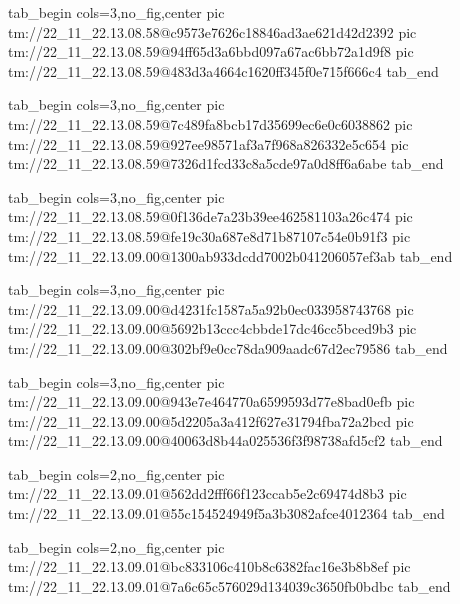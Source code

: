  
 
 
 
 

\qqSecCmtScr


\ifcmt
  tab_begin cols=3,no_fig,center
    pic tm://22_11_22.13.08.58@c9573e7626c18846ad3ae621d42d2392
    pic tm://22_11_22.13.08.59@94ff65d3a6bbd097a67ac6bb72a1d9f8
    pic tm://22_11_22.13.08.59@483d3a4664c1620ff345f0e715f666c4
  tab_end
\fi


\ifcmt
  tab_begin cols=3,no_fig,center
    pic tm://22_11_22.13.08.59@7c489fa8bcb17d35699ec6e0c6038862
    pic tm://22_11_22.13.08.59@927ee98571af3a7f968a826332e5c654
    pic tm://22_11_22.13.08.59@7326d1fcd33c8a5cde97a0d8ff6a6abe
  tab_end
\fi


\ifcmt
  tab_begin cols=3,no_fig,center
    pic tm://22_11_22.13.08.59@0f136de7a23b39ee462581103a26c474
    pic tm://22_11_22.13.08.59@fe19c30a687e8d71b87107c54e0b91f3
    pic tm://22_11_22.13.09.00@1300ab933dcdd7002b041206057ef3ab
  tab_end
\fi


\ifcmt
  tab_begin cols=3,no_fig,center
    pic tm://22_11_22.13.09.00@d4231fc1587a5a92b0ec033958743768
    pic tm://22_11_22.13.09.00@5692b13ccc4cbbde17dc46cc5bced9b3
    pic tm://22_11_22.13.09.00@302bf9e0cc78da909aadc67d2ec79586
  tab_end
\fi


\ifcmt
  tab_begin cols=3,no_fig,center
    pic tm://22_11_22.13.09.00@943e7e464770a6599593d77e8bad0efb
    pic tm://22_11_22.13.09.00@5d2205a3a412f627e31794fba72a2bcd
    pic tm://22_11_22.13.09.00@40063d8b44a025536f3f98738afd5cf2
  tab_end
\fi


\ifcmt
  tab_begin cols=2,no_fig,center
    pic tm://22_11_22.13.09.01@562dd2fff66f123ccab5e2c69474d8b3
    pic tm://22_11_22.13.09.01@55c154524949f5a3b3082afce4012364
  tab_end
\fi


\ifcmt
  tab_begin cols=2,no_fig,center
    pic tm://22_11_22.13.09.01@bc833106c410b8c6382fac16e3b8b8ef
    pic tm://22_11_22.13.09.01@7a6c65c576029d134039c3650fb0bdbc
  tab_end
\fi

